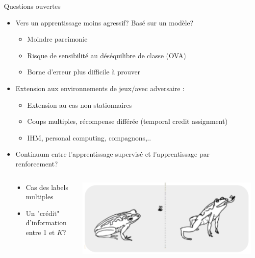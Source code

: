 \documentclass{beamer}
\begin{document}
\begin{frame}{Questions ouvertes}
	\begin{itemize}
		\item Vers un apprentissage moins agressif? Basé sur un modèle?
		\begin{itemize}
			\item Moindre parcimonie
			\item Risque de sensibilité au déséquilibre de classe (OVA)
			\item Borne d'erreur plus difficile à prouver
		\end{itemize}  
		\item Extension aux environnements de jeux/avec adversaire :
		\begin{itemize}
			\item Extension au cas non-stationnaires \cite{kivinen2004online} 
			\item Coups multiples, récompense différée (temporal credit assignment) \cite{sutton1998reinforcement}
			\item IHM, personal computing, compagnons,..
		\end{itemize}  		
		\item Continuum entre l'apprentissage supervisé et l'apprentissage par renforcement?
	\end{itemize}
	\vspace{-.7cm}
	\begin{columns}[t]
		\begin{column}{.01\linewidth}
		\end{column}
		\begin{column}{.4\linewidth}
			\begin{small}
			\begin{itemize}
				\item Cas des labels multiples
				\item Un "crédit" d'information entre 1 et $K$?
			\end{itemize} 
			\end{small}
		\end{column}
		\begin{column}{.4\linewidth}
			\begin{block}{}
				\centerline{\includegraphics[width=\linewidth]{figs/cap-frog.png}}
			\end{block}
		\end{column}
	\end{columns}
	

		
\end{frame}



\end{document}
